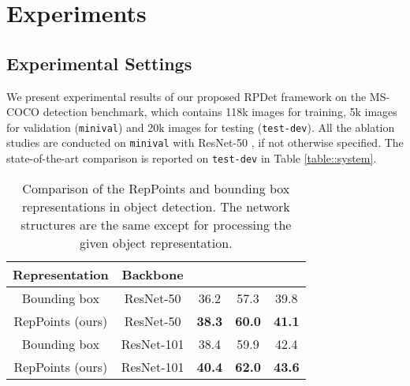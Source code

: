 \documentclass[10pt,twocolumn,letterpaper]{article}
\begin{document}
 
\vspace{-.5em}
\section{Experiments}

\subsection{Experimental Settings}
We present experimental results of our proposed RPDet framework on the MS-COCO \cite{MSCOCO} detection benchmark, which contains 118k images for training, 5k images for validation (\texttt{minival}) and 20k images for testing (\texttt{test-dev}). All the ablation studies are conducted on \texttt{minival} with ResNet-50 \cite{ResNet}, if not otherwise specified. The state-of-the-art comparison is reported on \texttt{test-dev} in Table \ref{table::system}.

\begin{table}[tb]
	\begin{center}
	\begin{tabular}{c|c|c|c|c}
	\hline
		Representation & Backbone &  &  &  \\
	\hline
	\hline
	Bounding box  & ResNet-50 & 36.2 & 57.3 & 39.8 \\
	\hline
	RepPoints (ours) & ResNet-50 & \textbf{38.3} & \textbf{60.0} & \textbf{41.1} \\
	\hline
	\hline
	Bounding box  & ResNet-101 & 38.4 & 59.9 & 42.4 \\
	\hline
	RepPoints (ours) & ResNet-101 & \textbf{40.4} & \textbf{62.0} & \textbf{43.6} \\
	\hline
	\end{tabular}
	\end{center}
\caption{Comparison of the RepPoints and bounding box representations in object detection. The network structures are the same except for processing the given object representation.}
\label{tab::reg-vs-sample-pts}
\vspace{-.5em}
\end{table}
\end{document}
